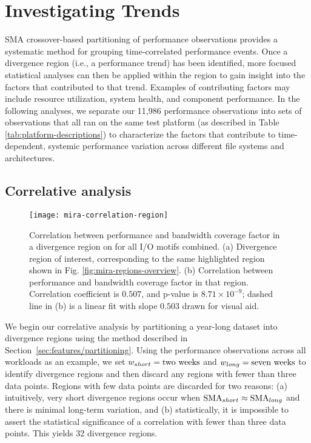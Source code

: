 \section{Investigating Trends}\label{sec:results}

SMA crossover-based partitioning of performance observations provides
a systematic method for grouping time-correlated performance events.
Once a divergence region (i.e., a performance trend) has been identified,
more focused statistical analyses can then be applied within the region
to gain insight into the factors that contributed to that trend.  Examples of
contributing factors may include resource utilization, system health, and component performance.
In the following analyses, we separate our 11,986 performance observations into sets of observations that all ran on the same test platform (as described in Table \ref{tab:platform-descriptions}) to characterize the factors that contribute to time-dependent, systemic performance variation across different file systems and architectures.

\subsection{Correlative analysis} \label{sec:results/correlate-mira}

\begin{figure}
    \centering
    \texttt{[image: mira-correlation-region]}
    \vspace{-.35in}
    \caption{Correlation between performance and bandwidth coverage factor in a divergence region on \mira for all I/O motifs combined.
    (a) Divergence region of interest,  corresponding to the same highlighted region shown in Fig. \ref{fig:mira-regions-overview}. (b) Correlation between performance and bandwidth coverage factor in that region.
    Correlation coefficient is $0.507$, and p-value is ${8.71 \times 10^{-9}}$; dashed line in (b) is a linear fit with slope $0.503$ drawn for visual aid.}
    \label{fig:mira-correlation-region}
	\vspace{-.15in}
\end{figure}

We begin our correlative analysis by partitioning a year-long dataset into
divergence regions using the method described in
Section~\ref{sec:features/partitioning}. Using the performance observations across all \mira
\mirafsone workloads as an example, we set ${w_{short} = \textup{two weeks}}$ and ${w_{long}
= \textup{seven weeks}}$ to identify divergence regions and then discard any
regions with fewer than three data points.  Regions with few data points are discarded
for two reasons: (a) intuitively, very short divergence regions occur
when $\textup{SMA}_{short} \approx \textup{SMA}_{long}$ and there is
minimal long-term variation, and (b) statistically, it is impossible
to assert the statistical significance of a correlation with fewer than
three data points.  This yields 32 divergence regions.

